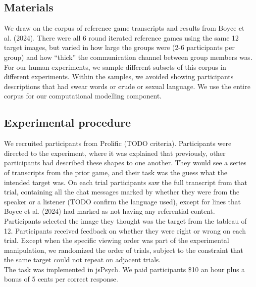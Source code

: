 \documentclass[10pt, letterpaper]{article}
\begin{document}
\subsection{Materials}\label{materials}

We draw on the corpus of reference game transcripts and results from
Boyce et al. (2024). There were all 6 round iterated reference games
using the same 12 target images, but varied in how large the groups were
(2-6 participants per group) and how ``thick'' the communication channel
between group members was. For our human experiments, we sample
different subsets of this corpus in different experiments. Within the
samples, we avoided showing participants descriptions that had swear
words or crude or sexual language. We use the entire corpus for our
computational modelling component.

\subsection{Experimental procedure}\label{experimental-procedure}

We recruited participants from Prolific (TODO criteria). Participants
were directed to the experiment, where it was explained that previously,
other participants had described these shapes to one another. They would
see a series of transcripts from the prior game, and their task was the
guess what the intended target was. On each trial participants saw the
full transcript from that trial, containing all the chat messages marked
by whether they were from the speaker or a listener (TODO confirm the
language used), except for lines that Boyce et al. (2024) had marked as
not having any referential content. Participants selected the image they
thought was the target from the tableau of 12. Participants received
feedback on whether they were right or wrong on each trial. Except when
the specific viewing order was part of the experimental manipulation, we
randomized the order of trials, subject to the constraint that the same
target could not repeat on adjacent trials.\\
The task was implemented in jsPsych. We paid participants \$10 an hour
plus a bonus of 5 cents per correct response.
\end{document}
